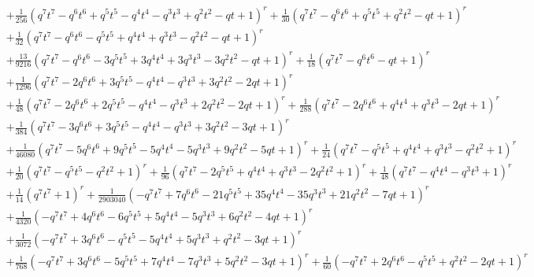 \documentclass[11pt,english]{amsart}
\numberwithin{equation}{section}
\numberwithin{figure}{section}
\theoremstyle{plain}
\theoremstyle{plain}
\theoremstyle{definition}
\theoremstyle{remark}
\begin{document}
{\begin{align*}
& + \frac{1}{256} {\left(q^{7} t^{7} - q^{6} t^{6} + q^{5} t^{5} - q^{4} t^{4} - q^{3} t^{3} + q^{2} t^{2} - q t + 1\right)}^{r} + \frac{1}{30} {\left(q^{7} t^{7} - q^{6} t^{6} + q^{5} t^{5} + q^{2} t^{2} - q t + 1\right)}^{r} \\
& + \frac{1}{32} {\left(q^{7} t^{7} - q^{6} t^{6} - q^{5} t^{5} + q^{4} t^{4} + q^{3} t^{3} - q^{2} t^{2} - q t + 1\right)}^{r} \\
& + \frac{13}{9216} {\left(q^{7} t^{7} - q^{6} t^{6} - 3 q^{5} t^{5} + 3 q^{4} t^{4} + 3 q^{3} t^{3} - 3 q^{2} t^{2} - q t + 1\right)}^{r} + \frac{1}{18} {\left(q^{7} t^{7} - q^{6} t^{6} - q t + 1\right)}^{r} \\
& + \frac{1}{1296} {\left(q^{7} t^{7} - 2 q^{6} t^{6} + 3 q^{5} t^{5} - q^{4} t^{4} - q^{3} t^{3} + 3 q^{2} t^{2} - 2 q t + 1\right)}^{r} \\
& + \frac{1}{48} {\left(q^{7} t^{7} - 2 q^{6} t^{6} + 2 q^{5} t^{5} - q^{4} t^{4} - q^{3} t^{3} + 2 q^{2} t^{2} - 2 q t + 1\right)}^{r} + \frac{1}{288} {\left(q^{7} t^{7} - 2 q^{6} t^{6} + q^{4} t^{4} + q^{3} t^{3} - 2 q t + 1\right)}^{r} \\
& + \frac{1}{384} {\left(q^{7} t^{7} - 3 q^{6} t^{6} + 3 q^{5} t^{5} - q^{4} t^{4} - q^{3} t^{3} + 3 q^{2} t^{2} - 3 q t + 1\right)}^{r} \\
& + \frac{1}{46080} {\left(q^{7} t^{7} - 5 q^{6} t^{6} + 9 q^{5} t^{5} - 5 q^{4} t^{4} - 5 q^{3} t^{3} + 9 q^{2} t^{2} - 5 q t + 1\right)}^{r} + \frac{1}{24} {\left(q^{7} t^{7} - q^{5} t^{5} + q^{4} t^{4} + q^{3} t^{3} - q^{2} t^{2} + 1\right)}^{r} \\
& + \frac{1}{20} {\left(q^{7} t^{7} - q^{5} t^{5} - q^{2} t^{2} + 1\right)}^{r} + \frac{1}{96} {\left(q^{7} t^{7} - 2 q^{5} t^{5} + q^{4} t^{4} + q^{3} t^{3} - 2 q^{2} t^{2} + 1\right)}^{r} + \frac{1}{48} {\left(q^{7} t^{7} - q^{4} t^{4} - q^{3} t^{3} + 1\right)}^{r} \\
& + \frac{1}{14} {\left(q^{7} t^{7} + 1\right)}^{r} + \frac{1}{2903040} {\left(-q^{7} t^{7} + 7 q^{6} t^{6} - 21 q^{5} t^{5} + 35 q^{4} t^{4} - 35 q^{3} t^{3} + 21 q^{2} t^{2} - 7 q t + 1\right)}^{r} \\
& + \frac{1}{4320} {\left(-q^{7} t^{7} + 4 q^{6} t^{6} - 6 q^{5} t^{5} + 5 q^{4} t^{4} - 5 q^{3} t^{3} + 6 q^{2} t^{2} - 4 q t + 1\right)}^{r} \\
& + \frac{1}{3072} {\left(-q^{7} t^{7} + 3 q^{6} t^{6} - q^{5} t^{5} - 5 q^{4} t^{4} + 5 q^{3} t^{3} + q^{2} t^{2} - 3 q t + 1\right)}^{r} \\
& + \frac{1}{768} {\left(-q^{7} t^{7} + 3 q^{6} t^{6} - 5 q^{5} t^{5} + 7 q^{4} t^{4} - 7 q^{3} t^{3} + 5 q^{2} t^{2} - 3 q t + 1\right)}^{r} + \frac{1}{60} {\left(-q^{7} t^{7} + 2 q^{6} t^{6} - q^{5} t^{5} + q^{2} t^{2} - 2 q t + 1\right)}^{r} \\

\end{align*}}
\end{document}

